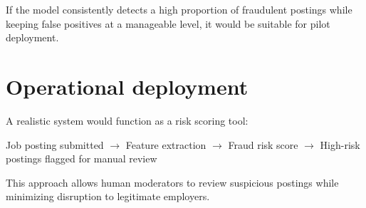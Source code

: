 \documentclass[11pt]{article}
\begin{document}
If the model consistently detects a high proportion of fraudulent postings while keeping false positives at a manageable level, it would be suitable for pilot deployment.

\section{Operational deployment}

A realistic system would function as a risk scoring tool:

\begin{center}
    Job posting submitted $\rightarrow$ Feature extraction $\rightarrow$ Fraud risk score $\rightarrow$ High-risk postings flagged for manual review
    \end{center}

This approach allows human moderators to review suspicious postings while minimizing disruption to legitimate employers.
\end{document}
